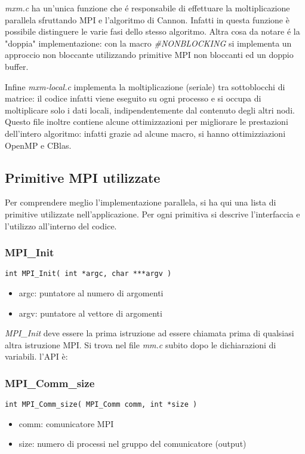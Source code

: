 \textit{mxm.c} ha un'unica funzione che \'{e} responsabile di effettuare la moltiplicazione parallela sfruttando MPI e l'algoritmo di Cannon. Infatti in questa funzione \`{e} possibile distinguere le varie fasi dello stesso algoritmo.
Altra cosa da notare \'{e} la "doppia" implementazione: con la macro \textit{\#NONBLOCKING} si implementa un approccio non bloccante utilizzando primitive MPI non bloccanti ed un doppio buffer.

Infine \textit{mxm-local.c} implementa la moltiplicazione (seriale) tra sottoblocchi di matrice: il codice infatti viene eseguito su ogni processo e si occupa di moltiplicare solo i dati locali, indipendentemente dal contenuto degli altri nodi. Questo file inoltre contiene alcune ottimizzazioni per migliorare le prestazioni dell'intero algoritmo: infatti grazie ad alcune macro, si hanno ottimizziazioni OpenMP e CBlas.

\subsection{Primitive MPI utilizzate}
Per comprendere meglio l'implementazione parallela, si ha qui una lista di primitive utilizzate nell'applicazione. Per ogni primitiva si descrive l'interfaccia e l'utilizzo all'interno del codice.

\subsubsection{MPI\_Init}
\begin{lstlisting}
int MPI_Init( int *argc, char ***argv )
\end{lstlisting}
\begin{itemize}
  \item argc: puntatore al numero di argomenti
  \item argv: puntatore al vettore di argomenti
\end{itemize}

\textit{MPI\_Init} deve essere la prima istruzione ad essere chiamata prima di qualsiasi altra istruzione MPI. Si trova nel file \textit{mm.c} subito dopo le dichiarazioni di variabili. l'API \`{e}:

\subsubsection{MPI\_Comm\_size}
\begin{lstlisting}
int MPI_Comm_size( MPI_Comm comm, int *size )
\end{lstlisting}
\begin{itemize}
  \item comm: comunicatore MPI
  \item size: numero di processi nel gruppo del comunicatore (output)
\end{itemize}

